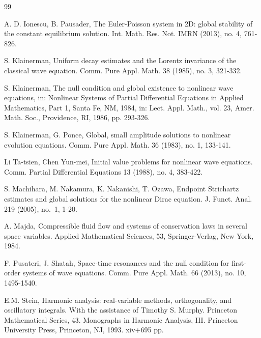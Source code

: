 \documentclass[11pt,twoside]{article}
\theoremstyle{plain}
\theoremstyle{definition}
\theoremstyle{assumption}
\numberwithin{equation}{section}
\begin{document}
\begin{thebibliography}{99}
		
		
		
		 A. D. Ionescu, B. Pausader,  The Euler-Poisson system in 2D: global stability of the constant equilibrium solution.
		Int. Math. Res. Not. IMRN (2013), no. 4, 761-826.
		
		
		
		
		
		
		
		 S. Klainerman, Uniform decay estimates and the Lorentz invariance of the classical wave equation.
		Comm. Pure Appl. Math. 38 (1985), no. 3, 321-332.
		
		 S. Klainerman, The null condition and global existence to nonlinear wave equations, in: Nonlinear Systems of Partial Differential Equations in Applied Mathematics, Part 1, Santa Fe, NM, 1984, in: Lect. Appl. Math., vol. 23, Amer. Math. Soc., Providence, RI, 1986, pp. 293-326.
		
		 S. Klainerman, G. Ponce, Global, small amplitude solutions to nonlinear evolution equations.
Comm. Pure Appl. Math. 36 (1983), no. 1, 133-141.
		
		
		
		
		 Li Ta-tsien, Chen Yun-mei, Initial value problems for nonlinear wave equations. Comm. Partial Differential Equations 13 (1988), no. 4, 383-422.
		
		
		
		
		S. Machihara, M. Nakamura, K. Nakanishi, T. Ozawa,
Endpoint Strichartz estimates and global solutions for the nonlinear Dirac equation. J. Funct. Anal. 219 (2005), no.~1, 1-20.
		
	 A. Majda, Compressible fluid flow and systems of conservation laws in several space
variables. Applied Mathematical Sciences, 53, Springer-Verlag, New York, 1984.

		
		
		
		 F. Pusateri, J. Shatah,  Space-time resonances and the null condition for first-order systems of wave equations.
		Comm. Pure Appl. Math. 66 (2013), no. 10, 1495-1540.
		
		
		
		
		 E.M. Stein, Harmonic analysis: real-variable methods, orthogonality, and oscillatory integrals.
		With the assistance of Timothy S. Murphy. Princeton Mathematical Series, 43. Monographs in Harmonic Analysis, III.
		Princeton University Press, Princeton, NJ, 1993. xiv+695 pp.
		

\end{thebibliography}
\end{document}
